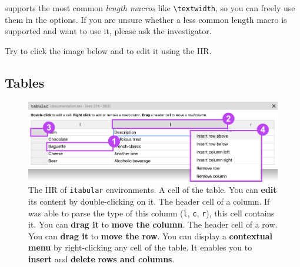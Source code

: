 \documentclass[11pt, a4paper]{article}
\begin{document}

\begin{info}
    \iLaTeX{} supports the most common \emph{length macros} like \verb|\textwidth|, so you can freely use them in the options.
    If you are unsure whether a less common length macro is supported and want to use it, please ask the investigator.
\end{info}


\begin{example}
    Try to click the image below and to edit it using the IIR.
    
    \centering
\end{example}




\newpage
\subsection{Tables}

\begin{figure}[hb!]
    \centering
    \includegraphics[width = \textwidth]{img/iir-itabular.png}
    \caption{The IIR of \texttt{itabular} environments.  A cell of the table. You can \textbf{edit} its content by double-clicking on it.  The header cell of a column. If \iLaTeX{} was able to parse the type of this column (\eg \texttt{l}, \texttt{c}, \texttt{r}), this cell contains it. You can \textbf{drag it} to \textbf{move the column}.  The header cell of a row. You can \textbf{drag it} to \textbf{move the row}.  You can display a \textbf{contextual menu} by right-clicking any cell of the table. It enables you to \textbf{insert} and \textbf{delete} \textbf{rows and columns}.}
    \label{fig:iir-itabular}
\end{figure}
\end{document}
